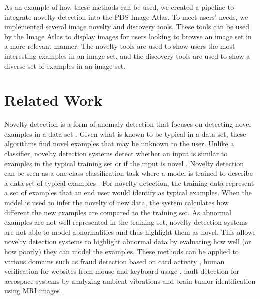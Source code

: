 As an example of how these methods can be used, we created a pipeline to integrate novelty detection into the PDS Image Atlas.
To meet users' needs, we implemented several image novelty and discovery tools.
These tools can be used by the Image Atlas to display images for users looking to browse an image set in a more relevant manner. 
The novelty tools are used to show users the most interesting examples in an image set, and the discovery tools are used to show a diverse set of examples in an image set.

\section{Related Work}
Novelty detection is a form of anomaly detection that focuses on detecting novel examples in a data set \parencite{domingues2019comparative}. 
Given what is known to be typical in a data set, these algorithms find novel examples that may be unknown to the user.
Unlike a classifier, novelty detection systems detect whether an input is similar to examples in the typical training set or if the input is novel \parencite{markou2003novelty}.
Novelty detection can be seen as a one-class classification task where a model is trained to describe a data set of typical examples \parencite{pimentel2014review}. 
For novelty detection, the training data represent a set of examples that an end user would identify as typical examples. 
When the model is used to infer the novelty of new data, the system calculates how different the new examples are compared to the training set. 
As abnormal examples are not well represented in the training set, novelty detection systems are not able to model abnormalities and thus highlight them as novel. 
This allows novelty detection systems to highlight abnormal data by evaluating how well (or how poorly) they can model the examples. 
These methods can be applied to various domains such as fraud detection based on card activity \parencite{oosterlinck2020one}, human verification for websites from mouse and keyboard usage \parencite{kim2018keystroke}, fault detection for aerospace systems by analyzing ambient vibrations \parencite{worden1997structural} and brain tumor identification using MRI images \parencite{wang2020brain}.

